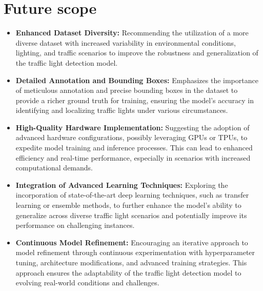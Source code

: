 \documentclass[12 pt]{report}
\begin{document}
\section{Future scope}
\begin{itemize}
  \item \textbf{Enhanced Dataset Diversity:}
        Recommending the utilization of a more diverse dataset with increased variability in environmental conditions, lighting, and traffic scenarios to improve the robustness and generalization of the traffic light detection model.

  \item \textbf{Detailed Annotation and Bounding Boxes:}
        Emphasizes the importance of meticulous annotation and precise bounding boxes in the dataset to provide a richer ground truth for training, ensuring the model's accuracy in identifying and localizing traffic lights under various circumstances.

  \item \textbf{High-Quality Hardware Implementation:}
        Suggesting the adoption of advanced hardware configurations, possibly leveraging GPUs or TPUs, to expedite model training and inference processes. This can lead to enhanced efficiency and real-time performance, especially in scenarios with increased computational demands.

  \item \textbf{Integration of Advanced Learning Techniques:}
        Exploring the incorporation of state-of-the-art deep learning techniques, such as transfer learning or ensemble methods, to further enhance the model's ability to generalize across diverse traffic light scenarios and potentially improve its performance on challenging instances.

  \item \textbf{Continuous Model Refinement:}
        Encouraging an iterative approach to model refinement through continuous experimentation with hyperparameter tuning, architecture modifications, and advanced training strategies. This approach ensures the adaptability of the traffic light detection model to evolving real-world conditions and challenges.
\end{itemize}


\newpage
\end{document}
